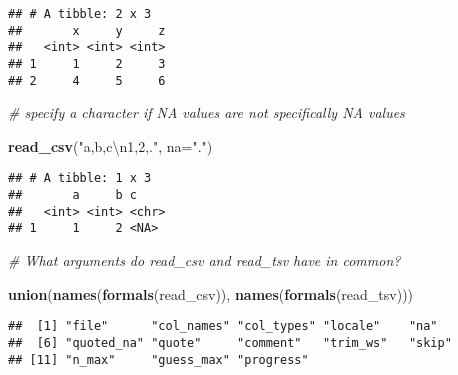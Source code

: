 \documentclass[]{article}
\newenvironment{Shaded}{\begin{snugshade}}{\end{snugshade}}
\newcommand{\KeywordTok}[1]{\textcolor[rgb]{0.13,0.29,0.53}{\textbf{#1}}}
\newcommand{\DataTypeTok}[1]{\textcolor[rgb]{0.13,0.29,0.53}{#1}}
\newcommand{\CharTok}[1]{\textcolor[rgb]{0.31,0.60,0.02}{#1}}
\newcommand{\StringTok}[1]{\textcolor[rgb]{0.31,0.60,0.02}{#1}}
\newcommand{\CommentTok}[1]{\textcolor[rgb]{0.56,0.35,0.01}{\textit{#1}}}
\newcommand{\NormalTok}[1]{#1}
\begin{document}
\begin{verbatim}
## # A tibble: 2 x 3
##       x     y     z
##   <int> <int> <int>
## 1     1     2     3
## 2     4     5     6
\end{verbatim}

\begin{Shaded}
\begin{Highlighting}[]
\CommentTok{# specify a character if NA values are not specifically NA values}

\KeywordTok{read_csv}\NormalTok{(}\StringTok{"a,b,c}\CharTok{\textbackslash{}n}\StringTok{1,2,."}\NormalTok{, }\DataTypeTok{na=}\StringTok{"."}\NormalTok{)}
\end{Highlighting}
\end{Shaded}

\begin{verbatim}
## # A tibble: 1 x 3
##       a     b c    
##   <int> <int> <chr>
## 1     1     2 <NA>
\end{verbatim}

\begin{Shaded}
\begin{Highlighting}[]
\CommentTok{# What arguments do read_csv and read_tsv have in common? }

\KeywordTok{union}\NormalTok{(}\KeywordTok{names}\NormalTok{(}\KeywordTok{formals}\NormalTok{(read_csv)), }\KeywordTok{names}\NormalTok{(}\KeywordTok{formals}\NormalTok{(read_tsv)))}
\end{Highlighting}
\end{Shaded}

\begin{verbatim}
##  [1] "file"      "col_names" "col_types" "locale"    "na"       
##  [6] "quoted_na" "quote"     "comment"   "trim_ws"   "skip"     
## [11] "n_max"     "guess_max" "progress"
\end{verbatim}
\end{document}
